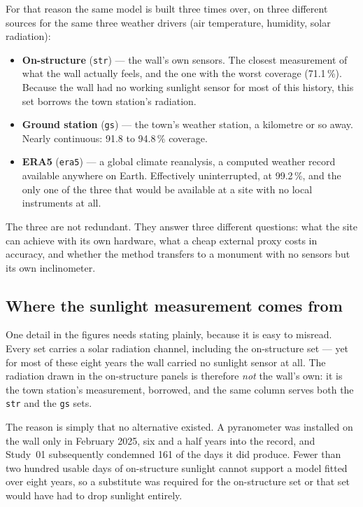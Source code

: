 \documentclass[11pt,a4paper]{article}
\begin{document}
For that reason the same model is built three times over, on three different
sources for the same three weather drivers (air temperature, humidity, solar
radiation):

\begin{itemize}
    \item \textbf{On-structure} (\texttt{str}) --- the wall's own sensors. The
    closest measurement of what the wall actually feels, and the one with the
    worst coverage (71.1\,\%). Because the wall had no working sunlight sensor
    for most of this history, this set borrows the town station's radiation.
    \item \textbf{Ground station} (\texttt{gs}) --- the town's weather station, a
    kilometre or so away. Nearly continuous: 91.8 to 94.8\,\% coverage.
    \item \textbf{ERA5} (\texttt{era5}) --- a global climate reanalysis, a
    computed weather record available anywhere on Earth. Effectively
    uninterrupted, at 99.2\,\%, and the only one of the three that would be
    available at a site with no local instruments at all.
\end{itemize}

The three are not redundant. They answer three different questions: what the site
can achieve with its own hardware, what a cheap external proxy costs in accuracy,
and whether the method transfers to a monument with no sensors but its own
inclinometer.

\subsection*{Where the sunlight measurement comes from}

One detail in the figures needs stating plainly, because it is easy to misread.
Every set carries a solar radiation channel, including the on-structure set --- yet
for most of these eight years the wall carried no sunlight sensor at all. The
radiation drawn in the on-structure panels is therefore \emph{not} the wall's own:
it is the town station's measurement, borrowed, and the same column serves both
the \texttt{str} and the \texttt{gs} sets.

The reason is simply that no alternative existed. A pyranometer was installed on
the wall only in February 2025, six and a half years into the record, and Study~01
subsequently condemned 161 of the days it did produce. Fewer than two hundred
usable days of on-structure sunlight cannot support a model fitted over eight
years, so a substitute was required for the on-structure set or that set would
have had to drop sunlight entirely.
\end{document}
